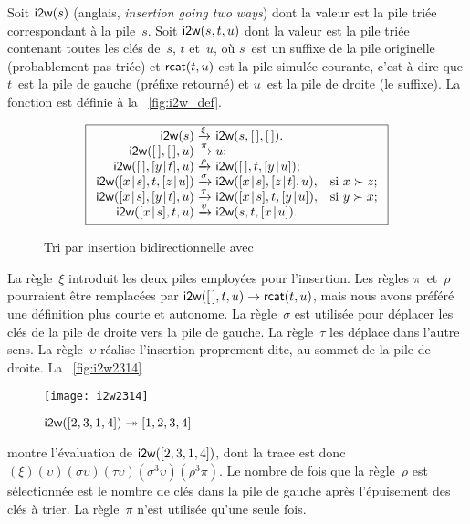 Soit \(\textsf{i2w}(s)\) (anglais, \emph{insertion
  going two ways}) dont la valeur est la pile triée correspondant à la
pile~\(s\). Soit \(\textsf{i2w}(s,t,u)\) dont la
valeur est la pile triée contenant toutes les clés de~\(s\), \(t\)
et~\(u\), où \(s\)~est un suffixe de la pile originelle (probablement
pas triée) et \(\textsf{rcat}(t,u)\) est la pile
simulée courante, c'est-à-dire que \(t\)~est la pile de gauche
(préfixe retourné) et \(u\)~est la pile de droite (le suffixe). La
fonction  est définie à la
\fig~\vref{fig:i2w_def}.
\begin{figure}[b]
\begin{equation*}
\boxed{%
\begin{array}{r@{\;}l@{\;}ll}
\fun{i2w}(s)         & \xrightarrow{\smash{\xi}}
                     & \fun{i2w}(s,\el,\el).\\
\fun{i2w}(\el,\el,u) & \xrightarrow{\smash{\pi}}
                     & u;\\
\fun{i2w}(\el,\cons{y}{t},u)
                     & \xrightarrow{\smash{\rho}}
                     & \fun{i2w}(\el,t,\cons{y}{u});\\
\fun{i2w}(\cons{x}{s},t,\cons{z}{u})
                     & \xrightarrow{\smash{\sigma}}
                     & \fun{i2w}(\cons{x}{s},\cons{z}{t},u),
                     & \text{si \(x \succ z\)};\\
\fun{i2w}(\cons{x}{s},\cons{y}{t},u)
                     & \xrightarrow{\smash{\tau}}
                     & \fun{i2w}(\cons{x}{s},t,\cons{y}{u}),
                     & \text{si \(y \succ x\)};\\
\fun{i2w}(\cons{x}{s},t,u)
                     & \xrightarrow{\smash{\upsilon}}
                     & \fun{i2w}(s,t,\cons{x}{u}).
\end{array}}
\end{equation*}
\caption{Tri par insertion bidirectionnelle avec }
\label{fig:i2w_def}
\end{figure}
La règle~\(\xi\) introduit les deux piles employées pour
l'insertion. Les règles \(\pi\)~et~\(\rho\) pourraient être remplacées
par \(\textsf{i2w}([\,],t,u) \rightarrow \textsf{rcat}(t,u)\), mais nous
avons préféré une définition plus courte et autonome. La
règle~\(\sigma\) est utilisée pour déplacer les clés de la pile de
droite vers la pile de gauche. La règle~\(\tau\) les déplace dans
l'autre sens. La règle~\(\upsilon\) réalise l'insertion proprement
dite, au sommet de la pile de droite. La \fig~\vref{fig:i2w2314}
\begin{figure}
\centering
\texttt{[image: i2w2314]}
\caption{\(\textsf{i2w}([2,3,1,4]) \twoheadrightarrow [1,2,3,4]\)}
\label{fig:i2w2314}
\end{figure}
montre l'évaluation  de
\(\textsf{i2w}([2,3,1,4])\), dont la trace est donc
\((\xi)(\upsilon)(\sigma\upsilon)
(\tau\upsilon)(\sigma^3\upsilon)(\rho^3\pi)\). Le nombre de fois que
la règle~\(\rho\) est sélectionnée est le nombre de clés dans la pile
de gauche après l'épuisement des clés à trier. La règle~\(\pi\) n'est
utilisée qu'une seule fois.

